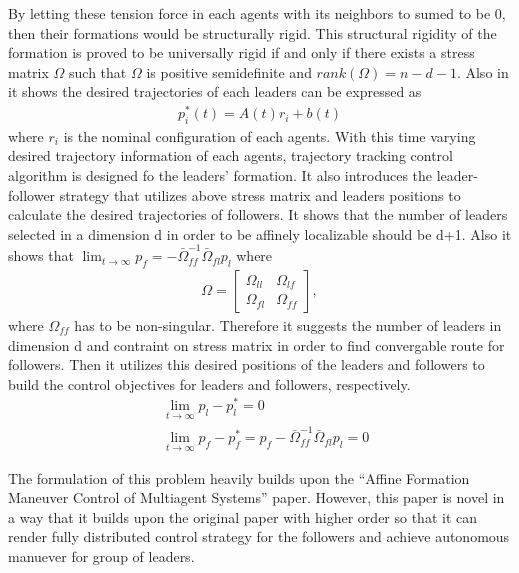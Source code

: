 By letting these tension force in each agents with its neighbors to sumed to be 0, then their formations would be structurally rigid. This structural rigidity of the formation is proved to be universally rigid if and only if there exists a stress matrix $\Omega$ such that $\Omega$ is positive semidefinite and $rank(\Omega) = n - d - 1$. \cite{ALFAKIH2008962}
Also in \cite{8270608} it shows the desired trajectories of each leaders can be expressed as 
\begin{align*}
    p_i^* (t) = A(t) r_i + b(t)
\end{align*}
where $r_i$ is the nominal configuration of each agents. With this time varying desired trajectory information of each agents, trajectory tracking control algorithm is designed fo the leaders' formation. It also introduces the leader-follower strategy that utilizes above stress matrix and leaders positions to calculate the desired trajectories of followers. It shows that the number of leaders selected in a dimension d in order to be affinely localizable should be d+1. Also it shows that $\lim_{t\rightarrow \infty}p_f = - \bar \Omega_{ff}^{-1} \bar \Omega_{fl} p_l$ where 
\begin{align*}
    \Omega = \begin{bmatrix}
    \Omega_{ll} & \Omega_{lf}\\
    \Omega_{fl} & \Omega_{ff}
    \end{bmatrix},
\end{align*} where $\Omega_{ff}$ has to be non-singular. Therefore it suggests the number of leaders in dimension d and contraint on stress matrix in order to find convergable route for followers. Then it utilizes this desired positions of the leaders and followers to build the control objectives for leaders and followers, respectively.
\begin{align*}
    &\lim_{t\rightarrow \infty} p_l - p_l^* = 0\\
    &\lim_{t\rightarrow \infty} p_f - p_f^*= p_f - \bar \Omega_{ff}^{-1} \bar \Omega_{fl} p_l = 0
\end{align*}

The formulation of this problem heavily builds upon the ``Affine Formation Maneuver Control of Multiagent Systems''\cite{8270608} paper. However, this paper\cite{9064493} is novel in a way that it builds upon the original paper with higher order so that it can render fully distributed control strategy for the followers and achieve autonomous manuever for group of leaders.

